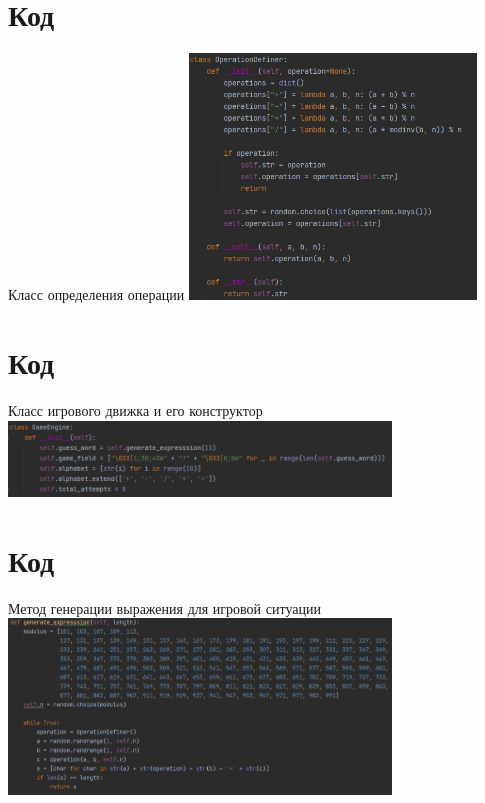 \documentclass[handout]{beamer}
\begin{document}
    \section{Код}
    \begin{frame}{Класс определения операции}
        \centering\includegraphics[width=3in, keepaspectratio]{OperationDefiner.png}
    \end{frame}
    \section{}
    

    \section{Код}
    \begin{frame}{Класс игрового движка и его конструктор}
        \centering\includegraphics[width=4in, keepaspectratio]{GE - Конструктор.png}
    \end{frame}

    \section{Код}
    \begin{frame}{Метод генерации выражения для игровой ситуации}
        \centering\includegraphics[width=4in, keepaspectratio]{GE - Генерация выражения.png}
    \end{frame}
\end{document}
